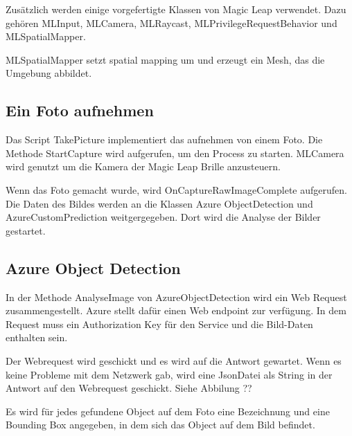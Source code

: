 \documentclass[german,a4paper, 12pt]{llncs}
\begin{document}
Zusätzlich werden einige vorgefertigte Klassen von Magic Leap verwendet. Dazu gehören MLInput, MLCamera, MLRaycast, MLPrivilegeRequestBehavior und MLSpatialMapper.

MLSpatialMapper setzt spatial mapping um und erzeugt ein Mesh, das die Umgebung abbildet.


\subsection{Ein Foto aufnehmen}

Das Script TakePicture implementiert das aufnehmen von einem Foto.
Die Methode StartCapture wird aufgerufen, um den Process zu starten. 
MLCamera wird genutzt um die Kamera der Magic Leap Brille anzusteuern.


Wenn das Foto gemacht wurde, wird OnCaptureRawImageComplete aufgerufen. Die Daten des Bildes werden an die Klassen Azure ObjectDetection und AzureCustomPrediction weitgergegeben. Dort wird die Analyse der Bilder gestartet. 

\subsection{Azure Object Detection}

In der Methode AnalyseImage von AzureObjectDetection wird ein Web Request zusammengestellt. Azure stellt dafür einen Web endpoint zur verfügung. In dem Request muss ein Authorization Key für den Service und die Bild-Daten enthalten sein.

Der Webrequest wird geschickt und es wird auf die Antwort gewartet. Wenn es keine Probleme mit dem Netzwerk gab, wird eine JsonDatei als String in der Antwort auf den Webrequest geschickt. Siehe Abbilung ??


Es wird für jedes gefundene Object auf dem Foto eine Bezeichnung und eine Bounding Box angegeben, in dem sich das Object auf dem Bild befindet. 
\end{document}
